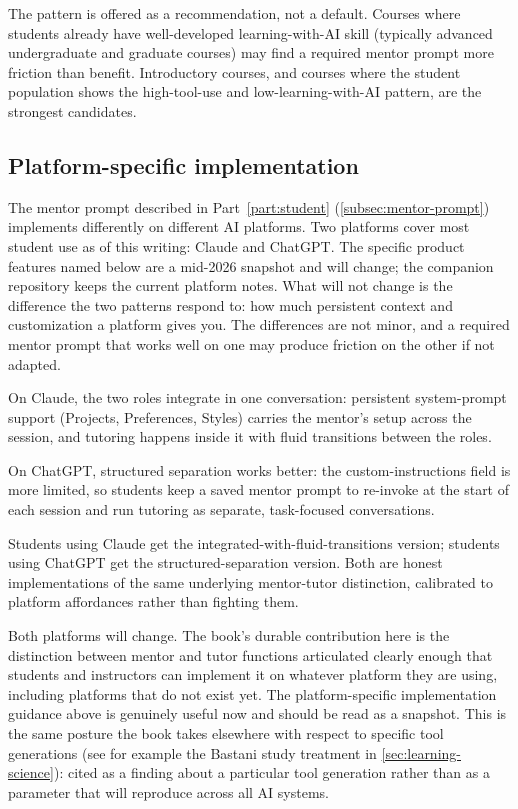 \documentclass{SIAMbook2023}
\begin{document}
The pattern is offered as a recommendation, not a default. Courses where students already have well-developed learning-with-AI skill (typically advanced undergraduate and graduate courses) may find a required mentor prompt more friction than benefit. Introductory courses, and courses where the student population shows the high-tool-use and low-learning-with-AI pattern, are the strongest candidates.

\subsection{Platform-specific implementation}
\label{i:subsec:platform-implementation}%

The mentor prompt described in Part~\ref{part:student} (\cref{subsec:mentor-prompt}) implements differently on different AI platforms. Two platforms cover most student use as of this writing: Claude and ChatGPT. The specific product features named below are a mid-2026 snapshot and will change; the companion repository keeps the current platform notes. What will not change is the difference the two patterns respond to: how much persistent context and customization a platform gives you. The differences are not minor, and a required mentor prompt that works well on one may produce friction on the other if not adapted.

On Claude, the two roles integrate in one conversation: persistent system-prompt support (Projects, Preferences, Styles) carries the mentor's setup across the session, and tutoring happens inside it with fluid transitions between the roles.

On ChatGPT, structured separation works better: the custom-instructions field is more limited, so students keep a saved mentor prompt to re-invoke at the start of each session and run tutoring as separate, task-focused conversations.

Students using Claude get the integrated-with-fluid-transitions version; students using ChatGPT get the structured-separation version. Both are honest implementations of the same underlying mentor-tutor distinction, calibrated to platform affordances rather than fighting them.

Both platforms will change. The book's durable contribution here is the distinction between mentor and tutor functions articulated clearly enough that students and instructors can implement it on whatever platform they are using, including platforms that do not exist yet. The platform-specific implementation guidance above is genuinely useful now and should be read as a snapshot. This is the same posture the book takes elsewhere with respect to specific tool generations (see for example the Bastani study treatment in \cref{sec:learning-science}): cited as a finding about a particular tool generation rather than as a parameter that will reproduce across all AI systems.
\end{document}
